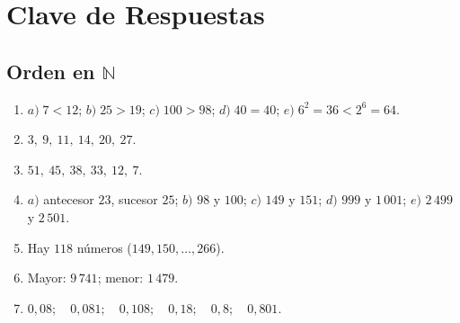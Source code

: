 \documentclass[12pt, letterpaper]{article}
\newcommand{\N}{\mathbb{N}}
\begin{document}
\newpage

\ifmwclaves
  \section{Clave de Respuestas}

  \subsection*{Orden en $\N$}
  \begin{enumerate}[leftmargin=*, label=\textbf{\arabic*.}]
    \item $a)\; 7 < 12$; \quad $b)\; 25 > 19$; \quad $c)\; 100 > 98$; \quad $d)\; 40 = 40$; \quad $e)\; 6^2 = 36 < 2^6 = 64$.
    \item $3,\ 9,\ 11,\ 14,\ 20,\ 27$.
    \item $51,\ 45,\ 38,\ 33,\ 12,\ 7$.
    \item $a)$ antecesor $23$, sucesor $25$; \quad $b)$ $98$ y $100$; \quad $c)$ $149$ y $151$; \quad $d)$ $999$ y $1\,001$; \quad $e)$ $2\,499$ y $2\,501$.
    \item Hay $118$ números ($149, 150, \dots, 266$).
    \item Mayor: $9\,741$; \quad menor: $1\,479$.
    \item $0{,}08;\quad 0{,}081;\quad 0{,}108;\quad 0{,}18;\quad 0{,}8;\quad 0{,}801$.
  \end{enumerate}
\end{document}
